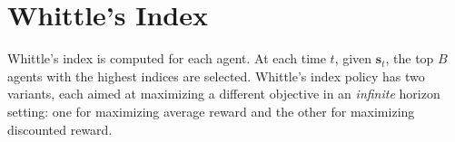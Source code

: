 \renewcommand{\theequation}{\thesection.\arabic{equation}}
\renewcommand{\thetable}{\thesection.\arabic{table}}
\renewcommand{\thealgorithm}{\thesection.\arabic{algorithm}}
\renewcommand{\thefigure}{\thesection.\arabic{figure}}
\section{Whittle's Index }\label{app:whittle}
Whittle's index is computed for each agent. 
At each time $t$, given $\bm s_t$, the top $B$ agents with the highest indices are selected.
Whittle's index policy has two variants, each aimed at maximizing a different objective in an \emph{infinite} horizon setting: one for maximizing average reward and the other for maximizing discounted reward.

